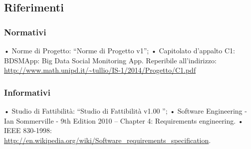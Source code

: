 \subsection{Riferimenti}
\subsubsection{Normativi}
• Norme di Progetto: “Norme di Progetto v1”;
• Capitolato d’appalto C1: BDSMApp: Big Data Social Monitoring App. Reperibile all’indirizzo: \url{http://www.math.unipd.it/~tullio/IS-1/2014/Progetto/C1.pdf}

\subsubsection{Informativi}
• Studio di Fattibilità: “Studio di Fattibilità v1.00 ”;
• Software Engineering - Ian Sommerville - 9th Edition 2010
– Chapter 4: Requirements engineering.
• IEEE 830-1998: \url{http://en.wikipedia.org/wiki/Software_requirements_specification}.